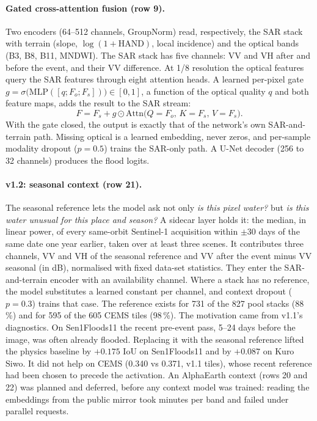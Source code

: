 \documentclass[10pt,twocolumn,a4paper]{article}
\newcommand{\pp}{\,\%}
\begin{document}
\paragraph{Gated cross-attention fusion (row 9).} Two encoders (64--512 channels, GroupNorm) read, respectively, the SAR
stack with terrain (slope, $\log(1{+}\mathrm{HAND})$, local incidence) and the optical bands (B3, B8, B11, MNDWI). The
SAR stack has five channels: VV and VH after and before the event, and their VV difference. At 1/8 resolution the
optical features query the SAR features through eight attention heads. A learned per-pixel gate
$g=\sigma\big(\mathrm{MLP}([q;F_o;F_s])\big)\in[0,1]$, a function of the optical quality $q$ and both feature maps,
adds the result to the SAR stream:
\begin{equation}
  F = F_s + g \odot \mathrm{Attn}\big(Q = F_o,\, K = F_s,\, V = F_s\big).
\end{equation}
With the gate closed, the output is exactly that of the network's own SAR-and-terrain path. Missing optical is a
learned embedding, never zeros, and per-sample modality dropout ($p=0.5$) trains the SAR-only path. A U-Net decoder (256 to 32 channels)
produces the flood logits.

\paragraph{v1.2: seasonal context (row 21).} The seasonal reference lets the model ask not only \emph{is this pixel
water?} but \emph{is this water unusual for this place and season?} A sidecar layer holds it: the median, in linear power,
of every same-orbit Sentinel-1 acquisition within $\pm30$ days of the same date one year earlier, taken over at least
three scenes. It contributes three channels, VV and VH of the seasonal reference and VV after the event minus VV
seasonal (in dB), normalised with fixed data-set statistics. They enter the SAR-and-terrain encoder with an
availability channel. Where a stack has no reference, the model substitutes a learned constant per channel, and
context dropout ($p=0.3$) trains that case. The reference exists for 731 of the 827 pool stacks (88\pp{}) and for 595
of the 605 CEMS tiles (98\pp{}).
The motivation came from v1.1's diagnostics. On Sen1Floods11 the recent pre-event pass, 5--24 days before the image,
was often already flooded. Replacing it with the seasonal reference lifted the physics baseline by $+0.175$ IoU on
Sen1Floods11 and by $+0.087$ on Kuro Siwo. It did not help on CEMS (0.340 vs 0.371, v1.1 tiles), whose recent reference had been
chosen to precede the activation.
An AlphaEarth context (rows 20 and 22) was planned and deferred, before any context model was trained: reading the
embeddings from the public mirror took minutes per band and failed under parallel requests.
\end{document}
